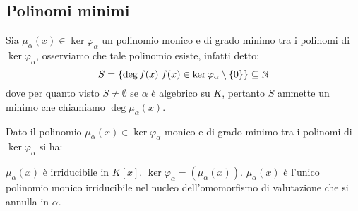 \documentclass[11pt]{scrartcl}
\begin{document}
\subsection{Polinomi minimi}

Sia $\mu_\alpha (x) \in \ker \varphi_\alpha$ un polinomio monico e di grado minimo tra i polinomi di $ \ker\varphi_\alpha$, osserviamo che tale polinomio esiste, infatti detto:
	\[ S = \{\deg f(x) | f(x) \in \ker{\varphi_\alpha}\setminus\{0\}\}\subseteq \mathbb N
	\]
dove per quanto visto $S \ne \emptyset$ se $\alpha$ è algebrico su $K$, pertanto $S$ ammette un minimo che chiamiamo $\deg \mu_\alpha(x)$. 

\begin{proposition}	
Dato il polinomio $\mu_\alpha (x) \in \ker \varphi_\alpha$ monico e di grado minimo tra i polinomi di $ \ker\varphi_\alpha$ si ha:
	\begin{enumerate}[(1)]
	\ii $\mu_\alpha (x)$ è irriducibile in $K[x]$.
	\ii $\ker \varphi_\alpha = (\mu_\alpha (x))$.
	\ii $\mu_\alpha (x)$ è l'unico polinomio monico irriducibile nel nucleo dell'omomorfismo di valutazione che si annulla in $\alpha$.
	\end{enumerate}
\end{proposition}
\end{document}
